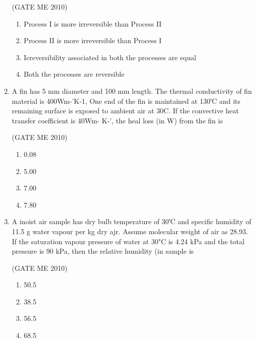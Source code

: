\documentclass[journal,12pt,onecolumn]{IEEEtran}
\theoremstyle{remark}
\begin{document}
\begin{enumerate}
\hfill{(GATE  ME 2010)}\\

 
\begin{enumerate}
\item Process I is more irreversible than Process II
\item Process II is more irreversible than Process I
\item Icreversibility associated in both the processes are equal
\item Both the processes are reversible
\end{enumerate}
 


\item A fin has 5 mm diameter and 100 mm length. The thermal conductivity of fin material is
400Wm-'K-1, One end of the fin is maintained at 130℃ and its remaining surface is exposed to
ambient air at 30C. If the convective heat transfer coefficient is 40Wm- K-', the heal loss
(in W) from the fin is

\hfill{(GATE  ME 2010)}\\


\begin{multicols}{4}
\begin{enumerate}
\item 0.08
\item 5.00
\item 7.00
\item 7.80
\end{enumerate}
\end{multicols}

\item A inoist air sample has dry bulb temperature of 30℃ and specific humidity of 11.5 g water vapour per kg dry ajr. Assume molecular weight of air as 28.93. If the saturation vapour pressure of water at 30"C is 4.24 kPa and the total pressure is 90 kPa, then the relative humidity (in %
sample is


\hfill{(GATE  ME 2010)}\\


\begin{multicols}{4}
\begin{enumerate}
\item 50.5
\item 38.5
\item 56.5
\item 68.5
\end{enumerate}
\end{multicols}



\end{enumerate}
\end{document}

